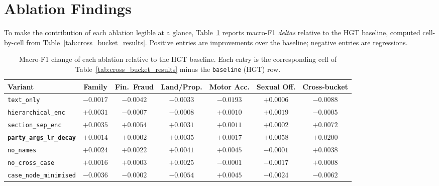 \section{Ablation Findings}
\label{sec:ablation_findings}

To make the contribution of each ablation legible at a glance,
Table~\ref{tab:ablation_delta} reports macro-F1 \emph{deltas}
relative to the HGT baseline, computed cell-by-cell from
Table~\ref{tab:cross_bucket_results}. Positive entries are
improvements over the baseline; negative entries are regressions.

\begin{table}[H]
  \centering
  \scriptsize
  \setlength{\tabcolsep}{4pt}
  \begin{adjustbox}{max width=\textwidth}
  \begin{tabular}{lcccccc}
    \toprule
    Variant & Family & Fin.\ Fraud & Land/Prop. & Motor Acc. & Sexual Off. & Cross-bucket \\
    \midrule
    \texttt{text\_only}                      & $-0.0017$ & $-0.0042$ & $-0.0033$ & $-0.0193$ & $+0.0006$ & $-0.0088$ \\
    \texttt{hierarchical\_enc}               & $+0.0031$ & $-0.0007$ & $-0.0008$ & $+0.0010$ & $+0.0019$ & $-0.0005$ \\
    \texttt{section\_sep\_enc}               & $+0.0035$ & $+0.0054$ & $+0.0031$ & $+0.0011$ & $+0.0002$ & $+0.0072$ \\
    \textbf{\texttt{party\_args\_lr\_decay}} & $+0.0014$ & $+0.0002$ & $+0.0035$ & $+0.0017$ & $+0.0058$ & $\mathbf{+0.0200}$ \\
    \texttt{no\_names}                       & $+0.0024$ & $+0.0022$ & $+0.0041$ & $+0.0045$ & $-0.0001$ & $+0.0038$ \\
    \texttt{no\_cross\_case}                 & $+0.0016$ & $+0.0003$ & $+0.0025$ & $-0.0001$ & $-0.0017$ & $+0.0008$ \\
    \texttt{case\_node\_minimised}           & $-0.0036$ & $-0.0002$ & $-0.0054$ & $+0.0045$ & $-0.0024$ & $-0.0062$ \\
    \bottomrule
  \end{tabular}
  \end{adjustbox}
  \caption{Macro-F1 change of each ablation relative to the HGT
  baseline. Each entry is the corresponding cell of
  Table~\ref{tab:cross_bucket_results} minus the
  \texttt{baseline} (HGT) row.}
  \label{tab:ablation_delta}
\end{table}

